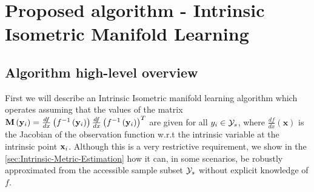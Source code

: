 

\section{Proposed algorithm - Intrinsic Isometric Manifold Learning}
	\label{sec:Intrinsic-isometric-manifold-learning}

	
	\subsection{Algorithm high-level overview}
	\label{ssec:Algorithm-high-level-overview}
	
	First we will describe an Intrinsic Isometric manifold learning algorithm which operates assuming that the values of the matrix $\mathbf{M}\left({\bf y}_{i}\right)=\frac{df}{dx}\left(f^{-1}\left({\bf y}_{i}\right)\right)\frac{df}{dx}\left(f^{-1}\left({\bf y}_{i}\right)\right)^{T}$ are given for all $y_{i}\in{\cal Y}_{s}$, where $\frac{df}{dx}\left(\mathbf{x}\right)$ is the Jacobian of the observation function w.r.t the intrinsic variable at the intrinsic point ${\bf x}_{i}$. Although this is a very restrictive requirement, we show in the \cref{sec:Intrinsic-Metric-Estimation} how it can, in some scenarios, be robustly approximated from the accessible sample subset ${\cal Y}_{s}$ without explicit knowledge of $f$.
	
